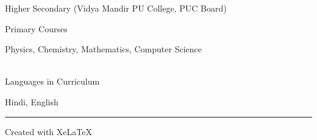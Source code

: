 \documentclass[a4paper,10pt]{article} %
\begin{document}
\bigskip

\par{\centering\Large \hypertarget{hs}{Higher Secondary (Vidya Mandir PU College, PUC Board) }\par}
\begin{center}
\large{Primary Courses\par}
\normalsize
Physics, Chemistry, Mathematics, Computer Science \\
~\\
\large{Languages in Curriculum\par}
\normalsize
Hindi, English \\
\end{center}
\bigskip
\hrule
\bigskip
\vfill
\centerline{Created with Xe\LaTeX\ }
\end{document}
